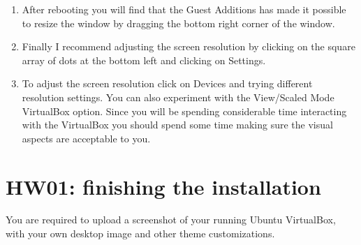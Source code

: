\begin{enumerate}[start=1,label={\bfseries Step \#\arabic*:}]
    \item After rebooting you will find that the Guest Additions has made it possible to resize the window by dragging the bottom right corner of the window.
    
    
    \item Finally I recommend adjusting the screen resolution by clicking on the square array of dots at the bottom left and clicking on Settings. 
    
    \item To adjust the screen resolution click on Devices and trying different resolution settings. You can also experiment with the View/Scaled Mode VirtualBox option. Since you will be spending considerable time interacting with the VirtualBox you should spend some time making sure the visual aspects are acceptable to you.
\end{enumerate}

\section{HW01: finishing the installation}

You are required to upload a screenshot of your running Ubuntu VirtualBox, with your own desktop image and other theme customizations. 

